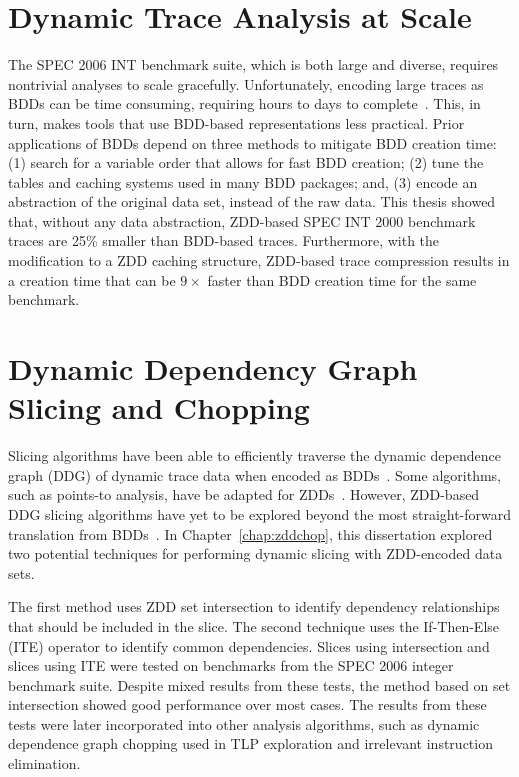 \documentclass[defaultstyle,11pt]{thesis}
\begin{document}
\section{Dynamic Trace Analysis at Scale}

The SPEC 2006 INT benchmark suite, which is both large and diverse,
requires nontrivial analyses to scale gracefully.  Unfortunately,
encoding large traces as BDDs can be time consuming, requiring hours
to days to complete~\cite{price:08:msthesis}.  This, in turn, makes
tools that use BDD-based representations less practical.  Prior
applications of BDDs depend on three methods to mitigate BDD creation
time: (1) search for a variable order that allows for fast BDD
creation; (2) tune the tables and caching systems used in many BDD
packages; and, (3) encode an abstraction of the original data set,
instead of the raw data.  This thesis showed that, without any data
abstraction, ZDD-based SPEC INT 2000 benchmark traces are 25\% smaller
than BDD-based traces.  Furthermore, with the modification to a ZDD
caching structure, ZDD-based trace compression results in a creation
time that can be $9\times$ faster than BDD creation time for the same
benchmark.

\section{Dynamic Dependency Graph Slicing and Chopping}

Slicing algorithms have been able to efficiently traverse the dynamic
dependence graph (DDG) of dynamic trace data when encoded as
BDDs~\cite{price:08:pact}.  Some algorithms, such as points-to
analysis, have be adapted for ZDDs~\cite{lhotak:08:lcpc}.  However,
ZDD-based DDG slicing algorithms have yet to be explored beyond the
most straight-forward translation from BDDs~\cite{price:10:cgo}. In
Chapter~\ref{chap:zddchop}, this dissertation explored two potential
techniques for performing dynamic slicing with ZDD-encoded data sets.

The first method uses ZDD set intersection to identify dependency
relationships that should be included in the slice.  The second
technique uses the If-Then-Else (ITE) operator to identify common
dependencies.  Slices using intersection and slices using ITE were
tested on benchmarks from the SPEC 2006 integer benchmark suite.
Despite mixed results from these tests, the method based on set
intersection showed good performance over most cases.  The results
from these tests were later incorporated into other analysis
algorithms, such as dynamic dependence graph chopping used in TLP
exploration and irrelevant instruction elimination.
\end{document}
